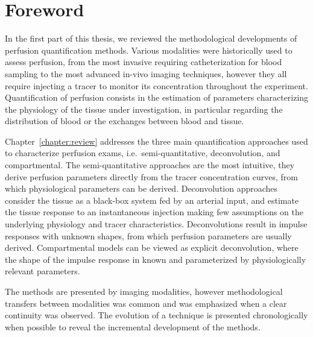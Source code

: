 \chapter*{Foreword}
In the first part of this thesis, we reviewed the methodological developments of perfusion quantification methods.
Various modalities were historically used to assess perfusion, from the most invasive requiring catheterization for blood sampling to the most advanced in-vivo imaging techniques, however they all require injecting a tracer to monitor its concentration throughout the experiment.
Quantification of perfusion consists in the estimation of parameters characterizing the physiology of the tissue under investigation, in particular regarding the distribution of blood or the exchanges between blood and tissue.

Chapter~\ref{chapter:review} addresses the three main quantification approaches used to characterize perfusion exams, i.e.~semi-quantitative, deconvolution, and compartmental.
The semi-quantitative approaches are the most intuitive, they derive perfusion parameters directly from the tracer concentration curves, from which physiological parameters can be derived.
Deconvolution approaches consider the tissue as a black-box system fed by an arterial input, and estimate the tissue response to an instantaneous injection making few assumptions on the underlying physiology and tracer characteristics. 
Deconvolutions result in impulse responses with unknown shapes, from which perfusion parameters are usually derived.
Compartmental models can be viewed as explicit deconvolution, where the shape of the impulse response in known and parameterized by physiologically relevant parameters.

The methods are presented by imaging modalities, however methodological transfers between modalities was common and was emphasized when a clear continuity was observed. 
The evolution of a technique is presented chronologically when possible to reveal the incremental development of the methods.